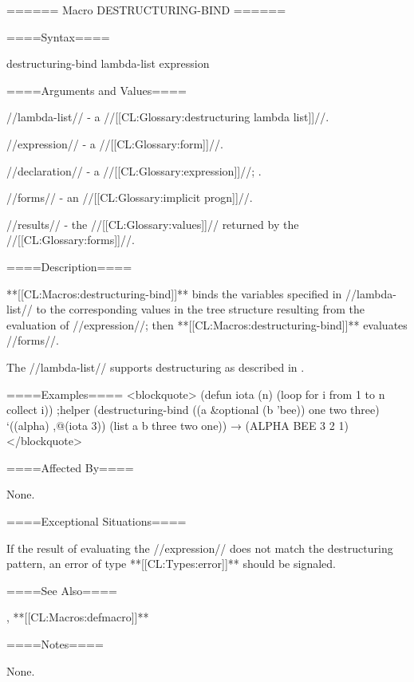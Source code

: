 ====== Macro DESTRUCTURING-BIND ======


====Syntax====

\DefmacWithValuesNewline destructuring-bind {lambda-list expression  } {}

====Arguments and Values====


//lambda-list// - a //[[CL:Glossary:destructuring lambda list]]//.

//expression// - a //[[CL:Glossary:form]]//.

//declaration// - a  //[[CL:Glossary:expression]]//; \noeval.

//forms// - an //[[CL:Glossary:implicit progn]]//.

//results// - the //[[CL:Glossary:values]]// returned by the //[[CL:Glossary:forms]]//.

====Description====

**[[CL:Macros:destructuring-bind]]** binds the variables specified in //lambda-list// to the corresponding values in the tree structure resulting from the evaluation of //expression//; then **[[CL:Macros:destructuring-bind]]** evaluates //forms//.


The //lambda-list// supports destructuring as described in \secref\DestructuringLambdaLists.

====Examples==== <blockquote> (defun iota (n) (loop for i from 1 to n collect i)) ;helper (destructuring-bind ((a &optional (b 'bee)) one two three) `((alpha) ,@(iota 3)) (list a b three two one)) → (ALPHA BEE 3 2 1) </blockquote>


====Affected By====

None.

====Exceptional Situations====

If the result of evaluating the //expression// does not match the destructuring pattern, an error of type **[[CL:Types:error]]** should be signaled.

====See Also====

, **[[CL:Macros:defmacro]]**

====Notes====

None.


 
